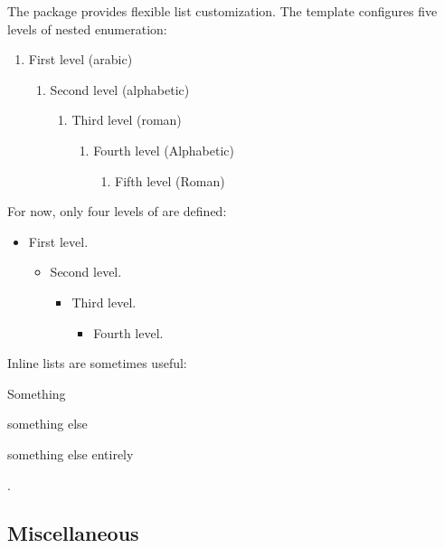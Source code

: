 The  package provides flexible list customization. The template configures five levels of nested enumeration:

\begin{enumerate}
    \item First level (arabic)
    \begin{enumerate}
        \item Second level (alphabetic)
        \begin{enumerate}
            \item Third level (roman)
            \begin{enumerate}
                \item Fourth level (Alphabetic)
                \begin{enumerate}
                    \item Fifth level (Roman)
                \end{enumerate}
            \end{enumerate}
        \end{enumerate}
    \end{enumerate}
\end{enumerate}

For now, only four levels of  are defined:

\begin{itemize}
    \item First level.
    \begin{itemize}
        \item Second level.
        \begin{itemize}
            \item Third level.
            \begin{itemize}
                \item Fourth level.
            \end{itemize}
        \end{itemize}
    \end{itemize}
\end{itemize}

Inline lists are sometimes useful: \begin{enumerate*}
    \item Something
    \item something else
    \item something else entirely
\end{enumerate*}.

\subsection{Miscellaneous}

